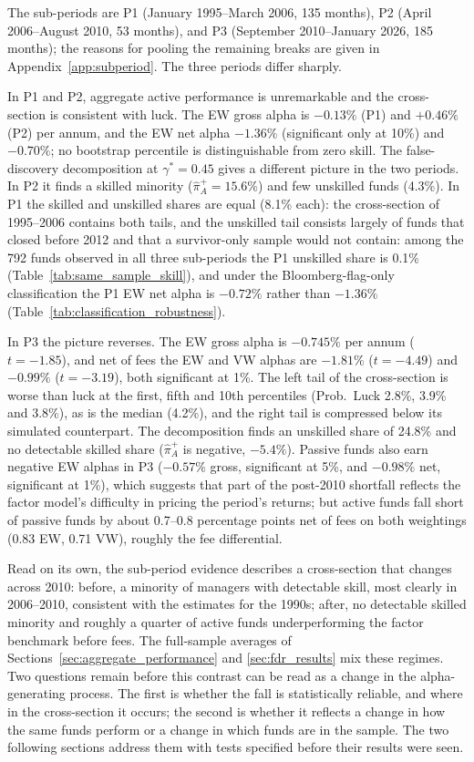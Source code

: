 \documentclass[12pt, oneside]{report}
\begin{document}
The sub-periods are P1 (January 1995--March 2006, 135 months), P2 (April
2006--August 2010, 53 months), and P3 (September 2010--January 2026, 185
months); the reasons for pooling the remaining breaks are given in
Appendix~\ref{app:subperiod}. The three periods differ sharply.

In P1 and P2, aggregate active performance is unremarkable and the
cross-section is consistent with luck. The EW gross alpha is $-0.13\%$
(P1) and $+0.46\%$ (P2) per annum, and the EW net alpha $-1.36\%$
(significant only at 10\%) and $-0.70\%$; no bootstrap percentile is distinguishable
from zero skill. The false-discovery decomposition at $\gamma^* = 0.45$
gives a different picture in the two periods. In P2 it finds a skilled
minority ($\hat{\pi}^+_A = 15.6\%$) and few unskilled funds
(4.3\%). In P1 the skilled and unskilled shares are equal (8.1\% each):
the cross-section of 1995--2006 contains both tails, and the unskilled
tail consists largely of funds that closed before 2012 and that a
survivor-only sample would not contain: among the 792 funds observed in
all three sub-periods the P1 unskilled share is 0.1\%
(Table~\ref{tab:same_sample_skill}), and under the Bloomberg-flag-only
classification the P1 EW net alpha is $-0.72\%$ rather than $-1.36\%$
(Table~\ref{tab:classification_robustness}).

In P3 the picture reverses. The EW gross alpha is $-0.745\%$ per annum
($t = -1.85$), and net of fees the EW and VW alphas are $-1.81\%$
($t = -4.49$) and $-0.99\%$ ($t = -3.19$), both significant at 1\%. The
left tail of the cross-section is worse than luck at the first, fifth and 10th
percentiles (Prob.\ Luck 2.8\%, 3.9\% and 3.8\%), as is the median (4.2\%), and the right tail
is compressed below its simulated counterpart. The decomposition finds an
unskilled share of 24.8\% and no detectable skilled share
($\hat{\pi}^+_A$ is negative, $-5.4\%$). Passive funds also earn
negative EW alphas in P3 ($-0.57\%$ gross, significant at 5\%, and
$-0.98\%$ net, significant at 1\%),
which suggests that part of the post-2010 shortfall reflects the
factor model's difficulty in pricing the period's returns; but active
funds fall short of passive funds by about 0.7--0.8 percentage points net
of fees on both weightings (0.83 EW, 0.71 VW), roughly the fee differential.

Read on its own, the sub-period evidence describes a cross-section that
changes across 2010: before, a minority of managers with detectable
skill, most clearly in 2006--2010, consistent with the
\textcite{BarrasScailletWermers2010} estimates for the 1990s; after, no
detectable skilled minority and roughly a quarter of active funds
underperforming the factor benchmark before fees. The full-sample
averages of Sections~\ref{sec:aggregate_performance} and
\ref{sec:fdr_results} mix these regimes. Two questions remain before
this contrast can be read as a change in the alpha-generating process.
The first is whether the fall is statistically reliable, and where in the
cross-section it occurs; the second is whether it reflects a change in
how the same funds perform or a change in which funds are in the sample.
The two following sections address them with tests specified before
their results were seen.
\end{document}
